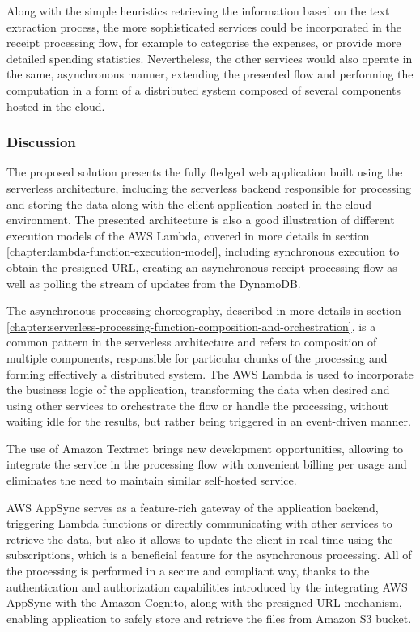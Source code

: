 Along with the simple heuristics retrieving the information based on the text extraction process, the more sophisticated services could be incorporated in the receipt processing flow, for example to categorise the expenses, or provide more detailed spending statistics. Nevertheless, the other services would also operate in the same, asynchronous manner, extending the presented flow and performing the computation in a form of a distributed system composed of several components hosted in the cloud.

\subsubsection{Discussion}

The proposed solution presents the fully fledged web application built using the serverless architecture, including the serverless backend responsible for processing and storing the data along with the client application hosted in the cloud environment.
The presented architecture is also a good illustration of different execution models of the AWS Lambda, covered in more details in section \ref{chapter:lambda-function-execution-model}, including synchronous execution to obtain the presigned URL, creating an asynchronous receipt processing flow as well as polling the stream of updates from the DynamoDB.

The asynchronous processing choreography, described in more details in section \ref{chapter:serverless-processing-function-composition-and-orchestration}, is a common pattern in the serverless architecture and refers to composition of multiple components, responsible for particular chunks of the processing and forming effectively a distributed system.
The AWS Lambda is used to incorporate the business logic of the application, transforming the data when desired and using other services to orchestrate the flow or handle the processing, without waiting idle for the results, but rather being triggered in an event-driven manner.

The use of Amazon Textract brings new development opportunities, allowing to integrate the service in the processing flow with convenient billing per usage and eliminates the need to maintain similar self-hosted service.

AWS AppSync serves as a feature-rich gateway of the application backend, triggering Lambda functions or directly communicating with other services to retrieve the data, but also it allows to update the client in real-time using the subscriptions, which is a beneficial feature for the asynchronous processing.
All of the processing is performed in a secure and compliant way, thanks to the authentication and authorization capabilities introduced by the integrating AWS AppSync with the Amazon Cognito, along with the presigned URL mechanism, enabling application to safely store and retrieve the files from Amazon S3 bucket.


